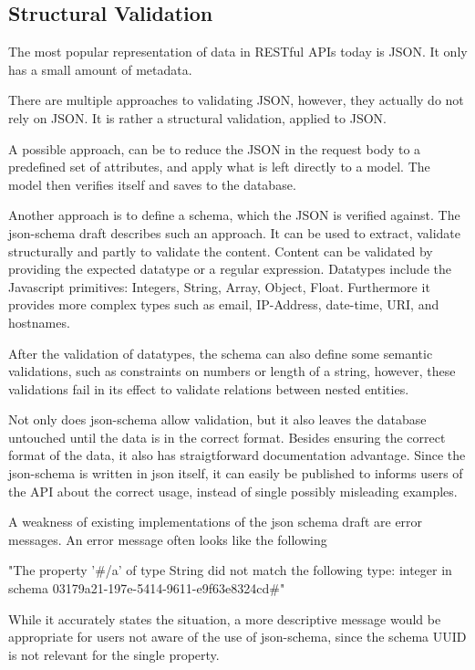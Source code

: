 \subsection{Structural Validation}

The most popular representation of data in RESTful APIs today is JSON. It only
has a small amount of metadata.

There are multiple approaches to validating JSON, however, they actually do not
rely on JSON. It is rather a structural validation, applied to JSON.

A possible approach, can be to reduce the JSON in the request body to a
predefined set of attributes, and apply what is left directly to a model. The
model then verifies itself and saves to the database.

Another approach is to define a schema, which the JSON is verified against. The
json-schema draft describes such an approach. It can be used to extract,
validate structurally and partly to validate the content. Content can be
validated by providing the expected datatype or a regular expression. Datatypes
include the Javascript primitives: Integers, String, Array, Object, Float.
Furthermore it provides more complex types such as email, IP-Address,
date-time, URI, and hostnames.

After the validation of datatypes, the schema can also define some semantic
validations, such as constraints on numbers or length of a string, however,
these validations fail in its effect to validate relations between nested
entities.

Not only does json-schema allow validation, but it also leaves the database
untouched until the data is in the correct format. Besides ensuring the correct
format of the data, it also has straigtforward documentation advantage. Since
the json-schema is written in json itself, it can easily be published to
informs users of the API about the correct usage, instead of single possibly
misleading examples.

A weakness of existing implementations of the json schema draft are error
messages. An error message often looks like the following

"The property '\#/a' of type String did not match the following type: integer in
schema 03179a21-197e-5414-9611-e9f63e8324cd\#"

While it accurately states the situation, a more descriptive message would be
appropriate for users not aware of the use of json-schema, since the schema
UUID is not relevant for the single property.

